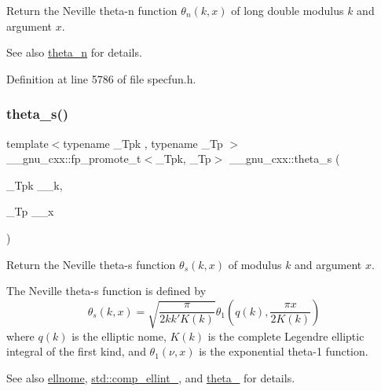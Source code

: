 Return the Neville theta-\/n function $ \theta_n(k,x) $ of {\ttfamily long double} modulus $ k $ and argument $ x $.

\begin{DoxySeeAlso}{See also}
\hyperlink{group__gnu__math__spec__func_ga202778bd650e04e9f3729bfca35c32e2}{theta\+\_\+n} for details. 
\end{DoxySeeAlso}


Definition at line 5786 of file specfun.\+h.

\mbox{\label{group__gnu__math__spec__func_gaf28f2dca107531890b49cccf2bdd67be}} 
\subsubsection{\texorpdfstring{theta\+\_\+s()}{theta\_s()}}
{\footnotesize\ttfamily template$<$typename \+\_\+\+Tpk , typename \+\_\+\+Tp $>$ \\
\+\_\+\+\_\+gnu\+\_\+cxx\+::fp\+\_\+promote\+\_\+t$<$\+\_\+\+Tpk, \+\_\+\+Tp$>$ \+\_\+\+\_\+gnu\+\_\+cxx\+::theta\+\_\+s (\begin{DoxyParamCaption}\item[{\+\_\+\+Tpk}]{\+\_\+\+\_\+k,  }\item[{\+\_\+\+Tp}]{\+\_\+\+\_\+x }\end{DoxyParamCaption})\hspace{0.3cm}{\ttfamily [inline]}}

Return the Neville theta-\/s function $ \theta_s(k,x) $ of modulus $ k $ and argument $ x $.

The Neville theta-\/s function is defined by \[ \theta_s(k,x) = \sqrt{\frac{\pi}{2 k k' K(k)}} \theta_1\left(q(k),\frac{\pi x}{2K(k)}\right) \] where $ q(k) $ is the elliptic nome, $ K(k) $ is the complete Legendre elliptic integral of the first kind, and $ \theta_1(\nu,x) $ is the exponential theta-\/1 function. \begin{DoxySeeAlso}{See also}
\hyperlink{group__gnu__math__spec__func_ga7bfb34f8b5c0ed7c72040f9cb7034bba}{ellnome}, \hyperlink{group__tr29124__math__spec__func_gad559217fb01e7a8b7a6e23eeedda64be}{std\+::comp\+\_\+ellint\+\_}, and \hyperlink{group__gnu__math__spec__func_gaa2e5a3a5f550fe032a596a8b01c878c0}{theta\+\_} for details.
\end{DoxySeeAlso}

